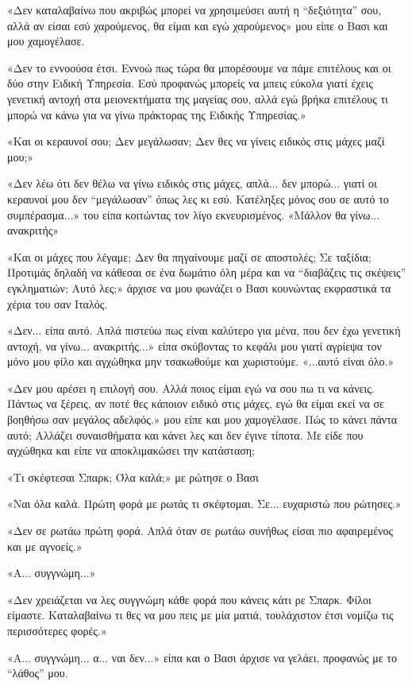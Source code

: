 \documentclass[12pt,twoside, openany]{book}
\begin{document}
«Δεν καταλαβαίνω που ακριβώς μπορεί να χρησιμεύσει αυτή η “δεξιότητα” σου, αλλά αν είσαι εσύ χαρούμενος, θα είμαι και εγώ χαρούμενος» μου είπε ο Βασι και μου χαμογέλασε.

«Δεν το εννοούσα έτσι. Εννοώ πως τώρα θα μπορέσουμε να πάμε επιτέλους και οι δύο στην Ειδική Υπηρεσία. Εσύ προφανώς μπορείς να μπεις εύκολα γιατί έχεις γενετική αντοχή στα μειονεκτήματα της μαγείας σου, αλλά εγώ βρήκα επιτέλους τι μπορώ να κάνω για να γίνω πράκτορας της Ειδικής Υπηρεσίας.»

«Και οι κεραυνοί σου; Δεν μεγάλωσαν; Δεν θες να γίνεις ειδικός στις μάχες μαζί μου;»

«Δεν λέω ότι δεν θέλω να γίνω ειδικός στις μάχες, απλά... δεν μπορώ... γιατί οι κεραυνοί μου δεν “μεγάλωσαν” όπως λες κι εσύ. Κατέληξες μόνος σου σε αυτό το συμπέρασμα...» του είπα κοιτώντας τον λίγο εκνευρισμένος. «Μάλλον θα γίνω... ανακριτής»

«Και οι μάχες που λέγαμε; Δεν θα πηγαίνουμε μαζί σε αποστολές; Σε ταξίδια; Προτιμάς δηλαδή να κάθεσαι σε ένα δωμάτιο όλη μέρα και να “διαβάζεις τις σκέψεις” εγκληματιών; Αυτό λες;» άρχισε να μου φωνάζει ο Βασι κουνώντας εκφραστικά τα χέρια του σαν Ιταλός.

«Δεν... είπα αυτό. Απλά πιστεύω πως είναι καλύτερο για μένα, που δεν έχω γενετική αντοχή, να γίνω... ανακριτής...» είπα σκύβοντας το κεφάλι μου γιατί αγρίεψα τον μόνο μου φίλο και αγχώθηκα μην τσακωθούμε και χωριστούμε. «...αυτό είναι όλο.»

«Δεν μου αρέσει η επιλογή σου. Αλλά ποιος είμαι εγώ να σου πω τι να κάνεις. Πάντως να ξέρεις, αν ποτέ θες κάποιον ειδικό στις μάχες, εγώ θα είμαι εκεί να σε βοηθήσω σαν μεγάλος αδελφός.» μου είπε και μου χαμογέλασε. Πώς το κάνει πάντα αυτό; Αλλάζει συναισθήματα και κάνει λες και δεν έγινε τίποτα. Με είδε που αγχώθηκα και είπε να αποκλιμακώσει την κατάσταση; 

«Τι σκέφτεσαι Σπαρκ; Όλα καλά;» με ρώτησε ο Βασι

«Ναι όλα καλά. Πρώτη φορά με ρωτάς τι σκέφτομαι. Σε... ευχαριστώ που ρώτησες.»

«Δεν σε ρωτάω πρώτη φορά. Απλά όταν σε ρωτάω συνήθως είσαι πιο αφαιρεμένος και με αγνοείς.»

«Α... συγγνώμη...»

«Δεν χρειάζεται να λες συγγνώμη κάθε φορά που κάνεις κάτι ρε Σπαρκ. Φίλοι είμαστε. Καταλαβαίνω τι θες να μου πεις με μία ματιά, τουλάχιστον έτσι νομίζω τις περισσότερες φορές.»

«Α... συγγνώμη... α... ναι δεν...» είπα και ο Βασι άρχισε να γελάει, προφανώς με το “λάθος” μου.
\end{document}
